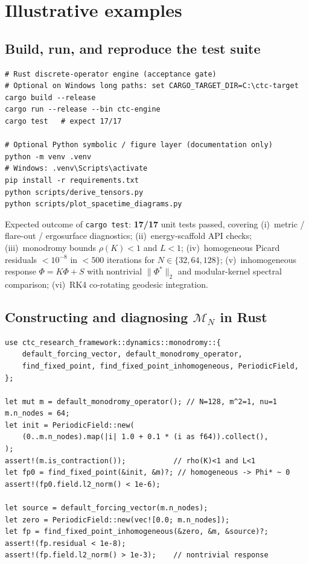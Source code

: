 \documentclass[preprint,12pt,a4paper]{elsarticle}
\newcommand{\MN}{\mathcal{M}_{N}}
\begin{document}
\section{Illustrative examples}
\label{sec:examples}

\subsection{Build, run, and reproduce the test suite}

\begin{lstlisting}[language={}]
# Rust discrete-operator engine (acceptance gate)
# Optional on Windows long paths: set CARGO_TARGET_DIR=C:\ctc-target
cargo build --release
cargo run --release --bin ctc-engine
cargo test   # expect 17/17

# Optional Python symbolic / figure layer (documentation only)
python -m venv .venv
# Windows: .venv\Scripts\activate
pip install -r requirements.txt
python scripts/derive_tensors.py
python scripts/plot_spacetime_diagrams.py
\end{lstlisting}

Expected outcome of \texttt{cargo test}: \textbf{17/17} unit tests passed, covering
(i)~metric / flare-out / ergosurface diagnostics;
(ii)~energy-scaffold API checks;
(iii)~monodromy bounds $\rho(K)<1$ and $L<1$;
(iv)~homogeneous Picard residuals $<10^{-8}$ in $<500$ iterations for $N\in\{32,64,128\}$;
(v)~inhomogeneous response $\Phi=K\Phi+S$ with nontrivial $\|\Phi^{*}\|_{2}$ and modular-kernel spectral comparison;
(vi)~RK4 co-rotating geodesic integration.

\subsection{Constructing and diagnosing $\MN$ in Rust}

\begin{lstlisting}[language={}]
use ctc_research_framework::dynamics::monodromy::{
    default_forcing_vector, default_monodromy_operator,
    find_fixed_point, find_fixed_point_inhomogeneous, PeriodicField,
};

let mut m = default_monodromy_operator(); // N=128, m^2=1, nu=1
m.n_nodes = 64;
let init = PeriodicField::new(
    (0..m.n_nodes).map(|i| 1.0 + 0.1 * (i as f64)).collect(),
);
assert!(m.is_contraction());           // rho(K)<1 and L<1
let fp0 = find_fixed_point(&init, &m)?; // homogeneous -> Phi* ~ 0
assert!(fp0.field.l2_norm() < 1e-6);

let source = default_forcing_vector(m.n_nodes);
let zero = PeriodicField::new(vec![0.0; m.n_nodes]);
let fp = find_fixed_point_inhomogeneous(&zero, &m, &source)?;
assert!(fp.residual < 1e-8);
assert!(fp.field.l2_norm() > 1e-3);    // nontrivial response
\end{lstlisting}
\end{document}
